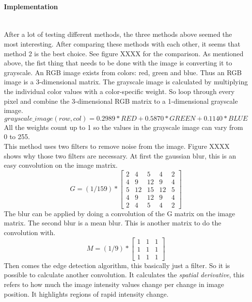 \documentclass[11pt]{article}
\begin{document}
\paragraph{Implementation}\mbox{}\\
After a lot of testing different methods, the three methods above seemed the most interesting. After comparing these methods with each other, it seems that method 2 is the best choice. See figure XXXX for the comparison. As mentioned above, the fist thing that needs to be done with the image is converting it to grayscale. An RGB image exists from colors: red, green and blue. Thus an RGB image is a 3-dimensional matrix. The grayscale image is calculated by multiplying the individual color values with a color-specific weight. So loop through every pixel and combine the 3-dimensional RGB matrix to a 1-dimensional grayscale image.
\begin{equation}
grayscale\_image(row, col) = 0.2989 * RED + 0.5870 * GREEN + 0.1140 * BLUE
\end{equation}
All the weights count up to 1 so the values in the grayscale image can vary from 0 to 255.
\\This method uses two filters to remove noise from the image. Figure XXXX shows why those two filters are necessary.
At first the gaussian blur, this is an easy convolution on the image matrix.
\begin{equation}
  G = (1/159) * 
  \begin{bmatrix}
   2 & 4 & 5 & 4 & 2\\
   4 & 9 & 12 & 9 & 4\\
   5 & 12 & 15 & 12 & 5\\
   4 & 9 & 12 & 9& 4\\
   2 & 4 & 5 & 4 & 2
  \end{bmatrix}
\end{equation}
The blur can be applied by doing a convolution of the G matrix on the image matrix.
The second blur is a mean blur. This is another matrix to do the convolution with.
\begin{equation}
M = (1/9) * 
\begin{bmatrix}
	1&1&1\\
	1&1&1\\
	1&1&1
\end{bmatrix}
\end{equation}
Then comes the edge detection algorithm, this basically just a filter. So it is possible to calculate another convolution. It calculates the \textit{spatial  derivative}, this refers to how much the image intensity values change per change in image position. It highlights regions of rapid intensity change.
\end{document}
